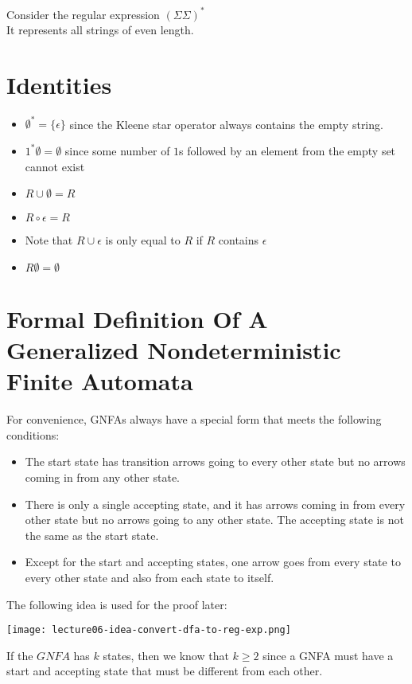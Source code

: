 \documentclass[11pt,a4paper]{article}
\begin{document}
\begin{example}
    Consider the regular expression $(\Sigma\Sigma)^*$ \\

    It represents all strings of even length.
\end{example}


\section{Identities}
\begin{itemize}
    \item $\emptyset^*=\{\epsilon\}$ since the Kleene star operator always contains the empty string.
    \item $1^*\emptyset=\emptyset$ since some number of $1$s followed by an element from the empty set cannot exist
    \item $R\cup\emptyset=R$
    \item $R\circ\epsilon=R$
    \item Note that $R\cup\epsilon$ is only equal to $R$ if $R$ contains $\epsilon$
    \item $R\emptyset=\emptyset$
\end{itemize}

\section{Formal Definition Of A Generalized Nondeterministic Finite Automata}
For convenience, GNFAs always have a special form that meets the following conditions:
\begin{itemize}
    \item The start state has transition arrows going to every other state but no arrows coming in from any other state.
    \item There is only a single accepting state, and it has arrows coming in from every other state but no arrows going to any other state. The accepting state is not the same as the start state.
    \item Except for the start and accepting states, one arrow goes from every state to every other state and also from each state to itself.
\end{itemize}

The following idea is used for the proof later:

\texttt{[image: lecture06-idea-convert-dfa-to-reg-exp.png]}

If the $GNFA$ has $k$ states, then we know that $k\geq 2$ since a GNFA must have a start and accepting state that must be different from each other. \\
\end{document}
